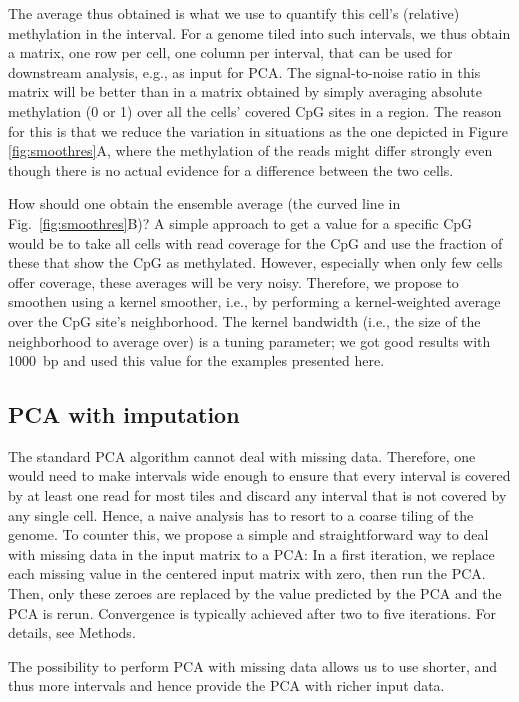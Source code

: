 \documentclass[twocolumn,10pt]{article}
\begin{document}
The average thus obtained is what we use to quantify this cell's (relative) methylation in the interval. For a genome tiled into such intervals, we thus obtain a matrix, one row per cell, one column per interval, that can be used for downstream analysis, e.g., as input for PCA. The signal-to-noise ratio in this matrix will be better than in a matrix obtained by simply averaging absolute methylation (0 or 1) over all the cells' covered CpG sites in a region. The reason for this is that we reduce the variation in situations as the one depicted in Figure \ref{fig:smoothres}A, where the methylation of the reads might differ strongly even though there is no actual evidence for a difference between the two cells.

How should one obtain the ensemble average (the curved line in Fig.\ \ref{fig:smoothres}B)? A simple approach to get a value for a specific CpG would be to take all cells with read coverage for the CpG and use the fraction of these that show the CpG as methylated. However, especially when only few cells offer coverage, these averages will be very noisy. Therefore, we propose to smoothen using a kernel smoother, i.e., by performing a kernel-weighted average over the CpG site's neighborhood. The kernel bandwidth (i.e., the size of the neighborhood to average over) is a tuning parameter; we got good results with 1000~bp and used this value for the examples presented here.

\subsection{PCA with imputation}

The standard PCA algorithm cannot deal with missing data. Therefore, one would need to make intervals wide enough to ensure that every interval is covered by at least one read for most tiles and discard any interval that is not covered by any single cell. Hence, a naive analysis has to resort to a coarse tiling of the genome. To counter this, we propose a simple and straightforward way to deal with missing data in the input matrix to a PCA: In a first iteration, we replace each missing value in the centered input matrix with zero, then run the PCA. Then, only these zeroes are replaced by the value predicted by the PCA and the PCA is rerun. Convergence is typically achieved after two to five iterations. For details, see Methods. 

The possibility to perform PCA with missing data allows us to use shorter, and thus more intervals and hence provide the PCA with richer input data.
\end{document}
